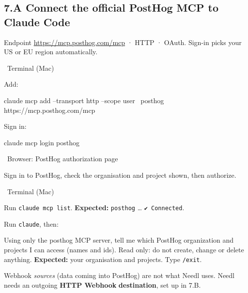 \documentclass[11pt,a4paper]{article}
\newcommand{\ui}[1]{\textbf{#1}}
\newcommand{\where}[1]{\par\smallskip\noindent\colorbox{winbg}{\color{winfg}\bfseries\strut\ #1\ }\par\nopagebreak[4]}
\newcommand{\lit}[1]{\texttt{#1}}
\newenvironment{prompt}{\def\FrameCommand{\fboxsep=6pt\fcolorbox{Gray}{okbg}}\MakeFramed{\advance\hsize-\width\FrameRestore}\raggedright}{\endMakeFramed}
\begin{document}
\subsection*{7.A Connect the official PostHog MCP to Claude Code}
Endpoint \url{https://mcp.posthog.com/mcp} · HTTP · OAuth. Sign-in picks your US or EU region automatically.
\where{Terminal (Mac)}
\begin{steps}
\item Add:
\begin{cmd}
claude mcp add --transport http --scope user \
  posthog https://mcp.posthog.com/mcp
\end{cmd}
\item Sign in:
\begin{cmd}
claude mcp login posthog
\end{cmd}
\where{Browser: PostHog authorization page}
\item Sign in to PostHog, check the organisation and project shown, then authorize.
\where{Terminal (Mac)}
\item Run \lit{claude mcp list}. \textbf{Expected:} \lit{posthog} … \lit{✔ Connected}.
\item Run \lit{claude}, then:
\begin{prompt}
Using only the posthog MCP server, tell me which PostHog organization and projects I can access (names and ids). Read only: do not create, change or delete anything.
\end{prompt}
\textbf{Expected:} your organisation and projects. Type \lit{/exit}.
\end{steps}
Webhook \emph{sources} (data coming into PostHog) are not what Needl uses. Needl needs an outgoing \ui{HTTP Webhook} \textbf{destination}, set up in 7.B.
\end{document}
